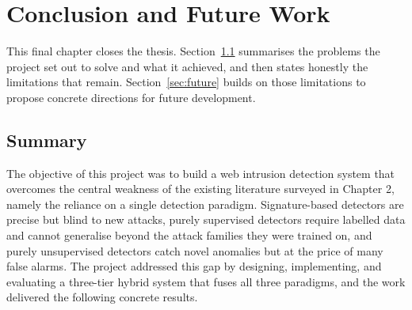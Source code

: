 \documentclass[12pt,a4paper]{report}
\begin{document}

\chapter{Conclusion and Future Work}
\label{chap:conclusion}

This final chapter closes the thesis. Section~\ref{sec:summary} summarises
the problems the project set out to solve and what it achieved, and then
states honestly the limitations that remain. Section~\ref{sec:future} builds
on those limitations to propose concrete directions for future development.

\section{Summary}
\label{sec:summary}

The objective of this project was to build a web intrusion detection system
that overcomes the central weakness of the existing literature surveyed in
Chapter 2, namely the reliance on a single detection
paradigm. Signature-based detectors are precise but blind to new attacks,
purely supervised detectors require labelled data and cannot generalise
beyond the attack families they were trained on, and purely unsupervised
detectors catch novel anomalies but at the price of many false alarms. The
project addressed this gap by designing, implementing, and evaluating a
three-tier hybrid system that fuses all three paradigms, and the work
delivered the following concrete results.
\end{document}
